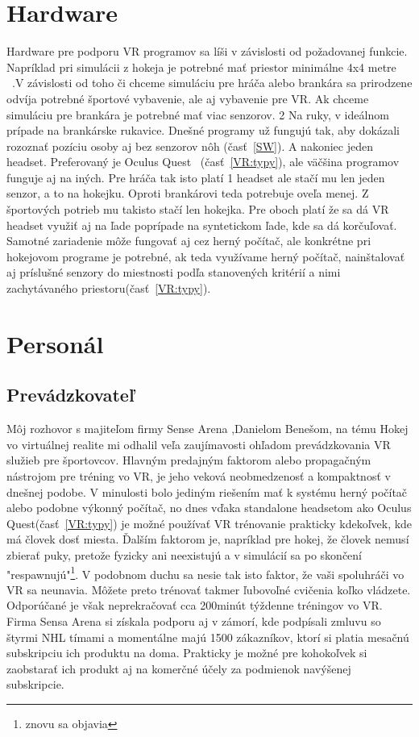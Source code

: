 \documentclass[10pt,twoside,slovak,a4paper]{article}										%
\begin{document}
\section{Hardware} \label{HW}
Hardware pre podporu VR programov sa líši v závislosti od požadovanej funkcie. Napríklad pri simulácii z hokeja je potrebné mať priestor minimálne 4x4 metre ~\cite{setuphk:zdroj}.V závislosti od toho či chceme simuláciu pre hráča alebo brankára sa prirodzene odvíja potrebné športové vybavenie, ale aj vybavenie pre VR. Ak chceme simuláciu pre brankára je potrebné mať viac senzorov. 2 Na ruky, v ideálnom prípade na brankárske rukavice. Dnešné programy už fungujú tak, aby dokázali rozoznať pozíciu osoby aj bez senzorov nôh (časť~\ref{SW}). A nakoniec jeden headset. Preferovaný je Oculus Quest ~\cite{headset:zdroj}(časť~\ref{VR:typy}), ale väčšina programov funguje aj na iných. Pre hráča tak isto platí 1 headset ale stačí mu len jeden senzor, a to na hokejku. Oproti brankárovi teda potrebuje oveľa menej. Z športových potrieb mu takisto stačí len hokejka. Pre oboch platí že sa dá VR headset využiť aj na ľade poprípade na syntetickom ľade, kde sa dá korčuľovať. Samotné zariadenie môže fungovať aj cez herný počítač, ale konkrétne pri hokejovom programe je potrebné, ak teda využívame herný počítač, nainštalovať aj príslušné senzory do miestnosti podľa stanovených kritérií a nimi zachytávaného priestoru(časť~\ref{VR:typy}).

\section{Personál} \label{PR}

\subsection{Prevádzkovateľ}\label{PR:boss}
Môj rozhovor s majiteľom firmy Sense Arena ,Danielom Benešom,  na tému Hokej vo virtuálnej realite mi odhalil veľa zaujímavosti ohľadom prevádzkovania VR služieb pre športovcov. Hlavným predajným faktorom alebo propagačným nástrojom pre tréning vo VR, je jeho veková neobmedzenosť a kompaktnosť v dnešnej podobe. V minulosti bolo jediným riešením mať k systému herný počítač alebo podobne výkonný počítač, no dnes vďaka standalone headsetom ako Oculus Quest(časť~\ref{VR:typy}) je možné používať VR trénovanie prakticky kdekoľvek, kde má človek dosť miesta.  Ďalším faktorom je, napríklad pre hokej, že človek nemusí zbierať puky, pretože fyzicky ani neexistujú a v simulácií sa po skončení "respawnujú"\footnote{znovu sa objavia}. V podobnom duchu sa nesie tak isto faktor, že vaši spoluhráči vo VR sa neunavia. Môžete preto trénovať takmer ľubovoľné cvičenia koľko vládzete. Odporúčané je však neprekračovať cca 200minút týždenne tréningov vo VR. Firma Sensa Arena si získala podporu aj v zámorí, kde podpísali zmluvu so štyrmi NHL tímami a momentálne majú 1500 zákazníkov, ktorí si platia mesačnú subskripciu ich produktu na doma. Prakticky je možné pre kohokoľvek si zaobstarať ich produkt aj na komerčné účely za podmienok navýšenej subskripcie.
\end{document}
